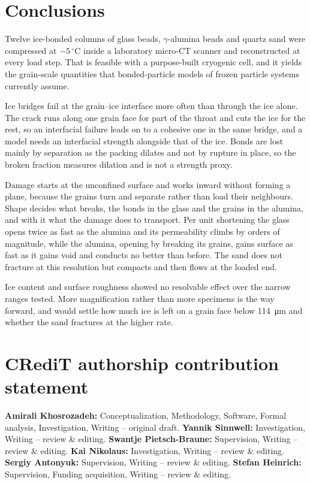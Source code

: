 \documentclass[preprint,12pt,numbers]{elsarticle}
\begin{document}
  \section{Conclusions}
  \label{sec:conclusions}
  Twelve ice-bonded columns of glass beads, $\gamma$-alumina beads and quartz
  sand were compressed at $-5\,^\circ$C inside a laboratory micro-CT scanner
  and reconstructed at every load step.  That is feasible with a purpose-built
  cryogenic cell, and it yields the grain-scale quantities that bonded-particle
  models of frozen particle systems currently assume.

  Ice bridges fail at the grain--ice interface more often than through the ice
  alone.  The crack runs along one grain face for part of the throat and cuts
  the ice for the rest, so an interfacial failure leads on to a cohesive one in
  the same bridge, and a model needs an interfacial strength alongside that of
  the ice.  Bonds are lost mainly by separation as the packing dilates and not
  by rupture in place, so the broken fraction measures dilation and is not a
  strength proxy.

  Damage starts at the unconfined surface and works inward without forming a
  plane, because the grains turn and separate rather than load their
  neighbours.  Shape decides what breaks, the bonds in the glass and the grains
  in the alumina, and with it what the damage does to transport.  Per unit shortening the glass opens twice as
  fast as the alumina and its permeability climbs by orders of magnitude,
  while the alumina, opening by breaking its grains, gains surface as fast as
  it gains void and conducts no better than before.  The sand does not
  fracture at this resolution but compacts and then flows at the loaded end.

  Ice content and surface roughness showed no resolvable effect over the
  narrow ranges tested.  More magnification rather than more specimens is the
  way forward, and would settle how much ice is left on a grain face below
  \SI{114}{\micro\meter} and whether the sand fractures at the higher rate.

  \section*{CRediT authorship contribution statement}
  \textbf{Amirali Khosrozadeh:} Conceptualization, Methodology, Software,
  Formal analysis, Investigation, Writing -- original draft.
  \textbf{Yannik Sinnwell:} Investigation, Writing -- review \& editing.
  \textbf{Swantje Pietsch-Braune:} Supervision, Writing -- review \& editing.
  \textbf{Kai Nikolaus:} Investigation, Writing -- review \& editing.
  \textbf{Sergiy Antonyuk:} Supervision, Writing -- review \& editing.
  \textbf{Stefan Heinrich:} Supervision, Funding acquisition, Writing --
  review \& editing.
\end{document}
